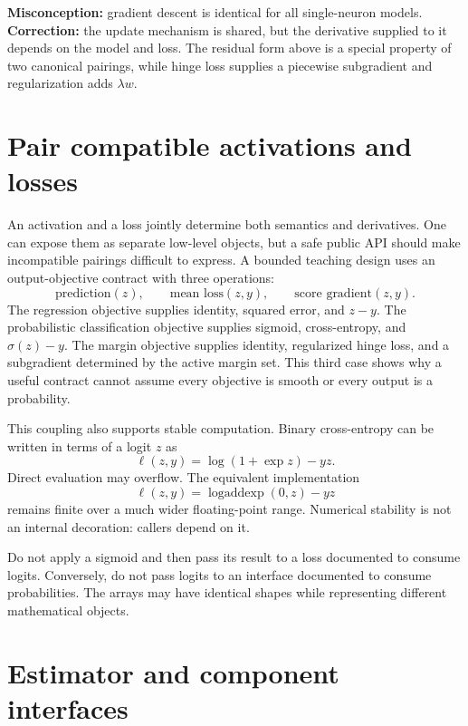 \begin{misconceptionbox}
\textbf{Misconception:} gradient descent is identical for all single-neuron
models. \textbf{Correction:} the update mechanism is shared, but the derivative
supplied to it depends on the model and loss. The residual form above is a
special property of two canonical pairings, while hinge loss supplies a
piecewise subgradient and regularization adds $\lambda w$.
\end{misconceptionbox}

\section{Pair compatible activations and losses}

An activation and a loss jointly determine both semantics and derivatives.
One can expose them as separate low-level objects, but a safe public API should
make incompatible pairings difficult to express. A bounded teaching design
uses an output-objective contract with three operations:
\[
  \text{prediction}(z),\qquad
  \text{mean loss}(z,y),\qquad
  \text{score gradient}(z,y).
\]
The regression objective supplies identity, squared error, and $z-y$. The
probabilistic classification objective supplies sigmoid, cross-entropy, and
$\sigma(z)-y$. The margin objective supplies identity, regularized hinge loss,
and a subgradient determined by the active margin set. This third case shows
why a useful contract cannot assume every objective is smooth or every output
is a probability.

This coupling also supports stable computation. Binary cross-entropy can be
written in terms of a logit $z$ as
\[
  \ell(z,y)=\log(1+\exp z)-yz.
\]
Direct evaluation may overflow. The equivalent implementation
\[
  \ell(z,y)=\operatorname{logaddexp}(0,z)-yz
\]
remains finite over a much wider floating-point range. Numerical stability is
not an internal decoration: callers depend on it.

\begin{warningbox}
Do not apply a sigmoid and then pass its result to a loss documented to consume
logits. Conversely, do not pass logits to an interface documented to consume
probabilities. The arrays may have identical shapes while representing
different mathematical objects.
\end{warningbox}

\section{Estimator and component interfaces}

